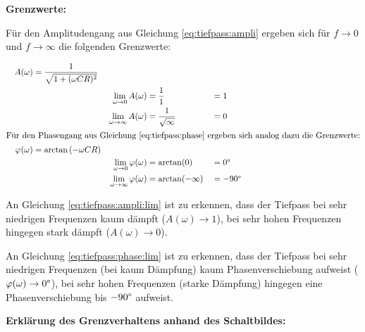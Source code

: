 \begin{frame}[t]
{    \textbf{Grenzwerte:}

    Für den Amplitudengang aus Gleichung \ref{eq:tiefpass:ampli} ergeben sich
    für $f \rightarrow 0$ und $f \rightarrow \infty$ die folgenden Grenzwerte:

    \begin{align}
        &&A(\omega) &=\frac{1}{\sqrt{1 + (\omega CR)^2}}    &                                           &                           &   &    &&\nonumber\\
        &&          &                                       &   \lim_{\omega \rightarrow 0}A(\omega)    &=\frac{1}{1}               &   &=1  &&\label{eq:tiefpass:ampli:lim}\\
        &&          &                                       &   \lim_{\omega \rightarrow \infty}A(\omega)&=\frac{1}{\sqrt{\infty}}  &   &=0  &&\nonumber
    \\\intertext{%
        Für den Phasengang aus Gleichung \ref{eq:tiefpass:phase} ergeben sich analog dazu die Grenzwerte:%
    }%
        &&\varphi(\omega)   &=\arctan\left(-\omega CR\right)&                                                   &                   &   &           &&\nonumber\\
        &&                  &                               &   \lim_{\omega \rightarrow 0}\varphi(\omega)      &=\arctan(0)        &   &=0\degree  &&\label{eq:tiefpass:phase:lim}\\
        &&                  &                               &   \lim_{\omega \rightarrow \infty}\varphi(\omega) &=\arctan(-\infty)  &   &=-90\degree&&\nonumber
    \end{align}

    An Gleichung \ref{eq:tiefpass:ampli:lim} ist zu erkennen, dass der Tiefpass bei sehr niedrigen Frequenzen kaum dämpft ($A(\omega) \rightarrow 1$), 
    bei sehr hohen Frequenzen hingegen stark dämpft ($A(\omega) \rightarrow 0$). 
    
    An Gleichung \ref{eq:tiefpass:phase:lim} ist zu erkennen, dass der Tiefpass bei sehr niedrigen Frequenzen (bei kaum Dämpfung) kaum Phasenverschiebung aufweist ($\varphi(\omega) \rightarrow 0\degree$),
    bei sehr hohen Frequenzen (starke Dämpfung) hingegen eine Phasenverschiebung bis $-90\degree$ aufweist. 

    \textbf{Erklärung des Grenzverhaltens anhand des Schaltbildes:}

}
\end{frame}
